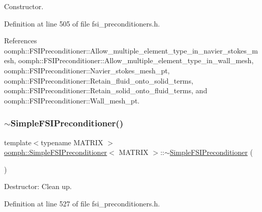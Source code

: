 Constructor. 



Definition at line 505 of file fsi\+\_\+preconditioners.\+h.



References oomph\+::\+F\+S\+I\+Preconditioner\+::\+Allow\+\_\+multiple\+\_\+element\+\_\+type\+\_\+in\+\_\+navier\+\_\+stokes\+\_\+mesh, oomph\+::\+F\+S\+I\+Preconditioner\+::\+Allow\+\_\+multiple\+\_\+element\+\_\+type\+\_\+in\+\_\+wall\+\_\+mesh, oomph\+::\+F\+S\+I\+Preconditioner\+::\+Navier\+\_\+stokes\+\_\+mesh\+\_\+pt, oomph\+::\+F\+S\+I\+Preconditioner\+::\+Retain\+\_\+fluid\+\_\+onto\+\_\+solid\+\_\+terms, oomph\+::\+F\+S\+I\+Preconditioner\+::\+Retain\+\_\+solid\+\_\+onto\+\_\+fluid\+\_\+terms, and oomph\+::\+F\+S\+I\+Preconditioner\+::\+Wall\+\_\+mesh\+\_\+pt.

\mbox{\label{classoomph_1_1SimpleFSIPreconditioner_a86515bb32fe8a2cdffda1d185751109d}} 
\subsubsection{\texorpdfstring{$\sim$\+Simple\+F\+S\+I\+Preconditioner()}{~SimpleFSIPreconditioner()}}
{\footnotesize\ttfamily template$<$typename M\+A\+T\+R\+IX $>$ \\
\hyperlink{classoomph_1_1SimpleFSIPreconditioner}{oomph\+::\+Simple\+F\+S\+I\+Preconditioner}$<$ M\+A\+T\+R\+IX $>$\+::$\sim$\hyperlink{classoomph_1_1SimpleFSIPreconditioner}{Simple\+F\+S\+I\+Preconditioner} (\begin{DoxyParamCaption}{ }\end{DoxyParamCaption})\hspace{0.3cm}{\ttfamily [inline]}}



Destructor\+: Clean up. 



Definition at line 527 of file fsi\+\_\+preconditioners.\+h.

\mbox{\label{classoomph_1_1SimpleFSIPreconditioner_a427e372b3153e9a26aa97c76d69e28a4}} 
